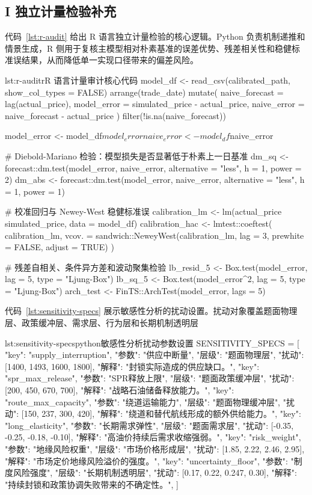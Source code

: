 \subsection*{I 独立计量检验补充}

代码~\ref{lst:r-audit} 给出 R 语言独立计量检验的核心逻辑。Python 负责机制递推和情景生成，R 侧用于复核主模型相对朴素基准的误差优势、残差相关性和稳健标准误结果，从而降低单一实现口径带来的偏差风险。

\begin{paperlisting}{lst:r-audit}{r}{R 语言计量审计核心代码}
model_df <- read_csv(calibrated_path, show_col_types = FALSE) %
  arrange(trade_date) %
  mutate(
    naive_forecast = lag(actual_price),
    model_error = simulated_price - actual_price,
    naive_error = naive_forecast - actual_price
  ) %
  filter(!is.na(naive_forecast))

model_error <- model_df$model_error
naive_error <- model_df$naive_error

# Diebold-Mariano 检验：模型损失是否显著低于朴素上一日基准
dm_sq <- forecast::dm.test(model_error, naive_error,
                           alternative = "less", h = 1, power = 2)
dm_abs <- forecast::dm.test(model_error, naive_error,
                            alternative = "less", h = 1, power = 1)

# 校准回归与 Newey-West 稳健标准误
calibration_lm <- lm(actual_price ~ simulated_price, data = model_df)
calibration_hac <- lmtest::coeftest(
  calibration_lm,
  vcov. = sandwich::NeweyWest(calibration_lm, lag = 3,
                              prewhite = FALSE, adjust = TRUE)
)

# 残差自相关、条件异方差和波动聚集检验
lb_resid_5 <- Box.test(model_error, lag = 5, type = "Ljung-Box")
lb_sq_5 <- Box.test(model_error^2, lag = 5, type = "Ljung-Box")
arch_test <- FinTS::ArchTest(model_error, lags = 5)
\end{paperlisting}

代码~\ref{lst:sensitivity-specs} 展示敏感性分析的扰动设置。扰动对象覆盖题面物理层、政策缓冲层、需求层、行为层和长期机制透明层

\begin{paperlisting}{lst:sensitivity-specs}{python}{敏感性分析扰动参数设置}
SENSITIVITY_SPECS = [
    {"key": "supply_interruption", "参数": "供应中断量",
     "层级": "题面物理层", "扰动": [1400, 1493, 1600, 1800],
     "解释": "封锁实际造成的供应缺口。"},
    {"key": "spr_max_release", "参数": "SPR释放上限",
     "层级": "题面政策缓冲层", "扰动": [200, 450, 670, 700],
     "解释": "战略石油储备释放能力。"},
    {"key": "route_max_capacity", "参数": "绕道运输能力",
     "层级": "题面物理缓冲层", "扰动": [150, 237, 300, 420],
     "解释": "绕道和替代航线形成的额外供给能力。"},
    {"key": "long_elasticity", "参数": "长期需求弹性",
     "层级": "题面需求层", "扰动": [-0.35, -0.25, -0.18, -0.10],
     "解释": "高油价持续后需求收缩强弱。"},
    {"key": "risk_weight", "参数": "地缘风险权重",
     "层级": "市场价格形成层", "扰动": [1.85, 2.22, 2.46, 2.95],
     "解释": "市场定价地缘风险溢价的强度。"},
    {"key": "uncertainty_floor", "参数": "制度风险强度",
     "层级": "长期机制透明层", "扰动": [0.17, 0.22, 0.247, 0.30],
     "解释": "持续封锁和政策协调失败带来的不确定性。"},
]
\end{paperlisting}

\clearpage
